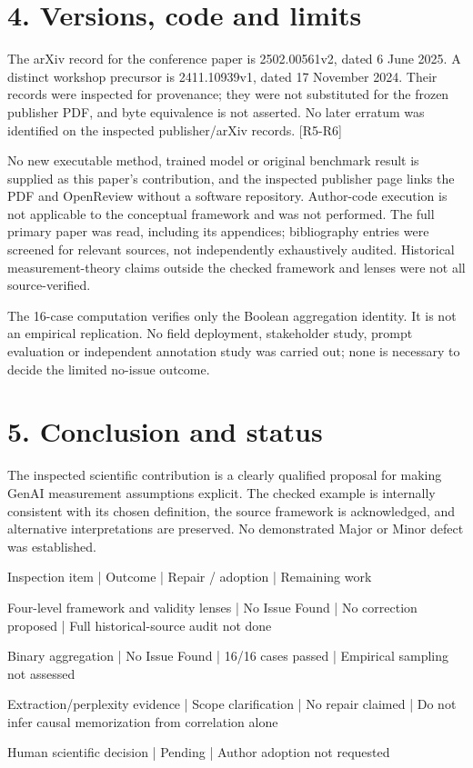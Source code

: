 \documentclass[10pt]{article}
\begin{document}
\section*{4. Versions, code and limits}
The arXiv record for the conference paper is 2502.00561v2, dated 6 June 2025. A distinct workshop precursor is 2411.10939v1, dated 17 November 2024. Their records were inspected for provenance; they were not substituted for the frozen publisher PDF, and byte equivalence is not asserted. No later erratum was identified on the inspected publisher/arXiv records. [R5-R6]\par
No new executable method, trained model or original benchmark result is supplied as this paper’s contribution, and the inspected publisher page links the PDF and OpenReview without a software repository. Author-code execution is not applicable to the conceptual framework and was not performed. The full primary paper was read, including its appendices; bibliography entries were screened for relevant sources, not independently exhaustively audited. Historical measurement-theory claims outside the checked framework and lenses were not all source-verified.\par
The 16-case computation verifies only the Boolean aggregation identity. It is not an empirical replication. No field deployment, stakeholder study, prompt evaluation or independent annotation study was carried out; none is necessary to decide the limited no-issue outcome.\par
\section*{5. Conclusion and status}
The inspected scientific contribution is a clearly qualified proposal for making GenAI measurement assumptions explicit. The checked example is internally consistent with its chosen definition, the source framework is acknowledged, and alternative interpretations are preserved. No demonstrated Major or Minor defect was established.\par
Inspection item | Outcome | Repair / adoption | Remaining work\par
Four-level framework and validity lenses | No Issue Found | No correction proposed | Full historical-source audit not done\par
Binary aggregation | No Issue Found | 16/16 cases passed | Empirical sampling not assessed\par
Extraction/perplexity evidence | Scope clarification | No repair claimed | Do not infer causal memorization from correlation alone\par
Human scientific decision | Pending | Author adoption not requested\par
\end{document}
